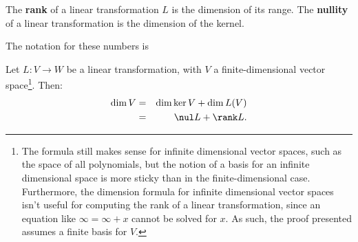 \begin{definition}
The {\bf rank} of a linear transformation $L$ is the dimension of its range.
The {\bf nullity} of a linear transformation is the dimension of the kernel.
\end{definition}
The notation for these numbers is 

\begin{theorem}\label{dimension_formula}
Let $L \colon V\rightarrow W$ be a linear transformation, with $V$ a finite-dimensional vector space\footnote{The formula still makes sense for infinite dimensional vector spaces, such as the space of all polynomials, but the notion of a basis for an infinite dimensional space is more sticky than in the finite-dimensional case.  Furthermore, the dimension formula for infinite dimensional vector spaces isn't useful for computing the rank of a linear transformation, since an equation like $\infty=\infty+x$ cannot be solved for $x$. As such, the proof presented assumes a finite basis for $V$.}.  Then:
\begin{eqnarray*}
\dim V &=& \dim \ker V + \dim L(V)\\
 &=& \nul L + \rank L.
\end{eqnarray*}
\end{theorem}



